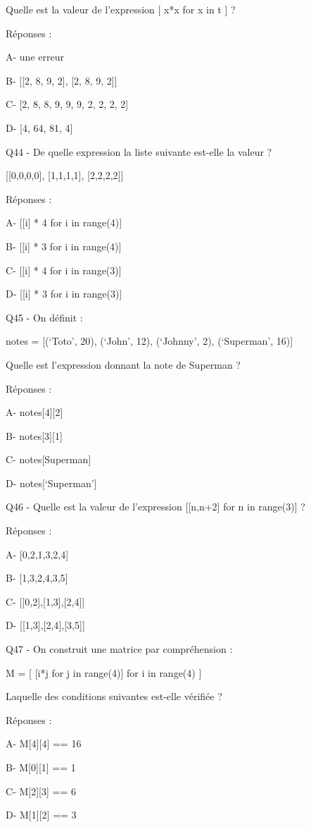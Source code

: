 \documentclass[
]{book}
\begin{document}
Quelle est la valeur de l'expression {[} x*x for x in t {]} ?

Réponses :

A- une erreur

B- {[}{[}2, 8, 9, 2{]}, {[}2, 8, 9, 2{]}{]}

C- {[}2, 8, 8, 9, 9, 9, 2, 2, 2, 2{]}

D- {[}4, 64, 81, 4{]}

Q44 - De quelle expression la liste suivante est-elle la valeur ?

{[}{[}0,0,0,0{]}, {[}1,1,1,1{]}, {[}2,2,2,2{]}{]}

Réponses :

A- {[}{[}i{]} * 4 for i in range(4){]}

B- {[}{[}i{]} * 3 for i in range(4){]}

C- {[}{[}i{]} * 4 for i in range(3){]}

D- {[}{[}i{]} * 3 for i in range(3){]}

Q45 - On définit :

notes = {[}(`Toto', 20), (`John', 12), (`Johnny', 2), (`Superman', 16){]}

Quelle est l'expression donnant la note de Superman ?

Réponses :

A- notes{[}4{]}{[}2{]}

B- notes{[}3{]}{[}1{]}

C- notes{[}Superman{]}

D- notes{[}`Superman'{]}

Q46 - Quelle est la valeur de l'expression {[}{[}n,n+2{]} for n in range(3){]} ?

Réponses :

A- {[}0,2,1,3,2,4{]}

B- {[}1,3,2,4,3,5{]}

C- {[}{[}0,2{]},{[}1,3{]},{[}2,4{]}{]}

D- {[}{[}1,3{]},{[}2,4{]},{[}3,5{]}{]}

Q47 - On construit une matrice par compréhension :

M = {[} {[}i*j for j in range(4){]} for i in range(4) {]}

Laquelle des conditions suivantes est-elle vérifiée ?

Réponses :

A- M{[}4{]}{[}4{]} == 16

B- M{[}0{]}{[}1{]} == 1

C- M{[}2{]}{[}3{]} == 6

D- M{[}1{]}{[}2{]} == 3
\end{document}

